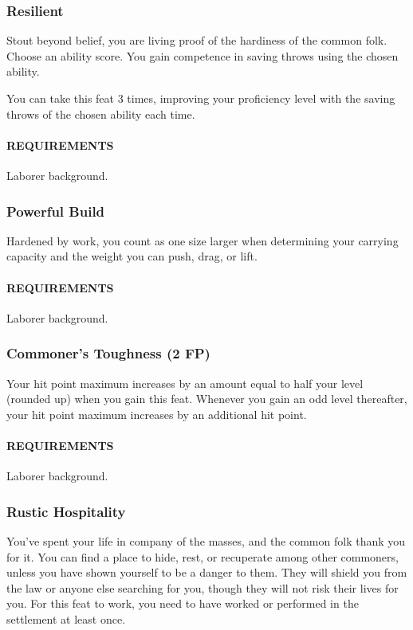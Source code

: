    \subsubsection{Resilient} \label{feat::resilient}
        Stout beyond belief, you are living proof of the hardiness of the common folk.
        Choose an ability score.
        You gain competence in saving throws using the chosen ability.

        You can take this feat 3 times, improving your proficiency level with the saving throws of the chosen ability each time.
        \paragraph{REQUIREMENTS} Laborer background.

    \subsubsection{Powerful Build} \label{feat::powerfulbuild}
        Hardened by work, you count as one size larger when determining your carrying capacity and the weight you can push, drag, or lift.
        \paragraph{REQUIREMENTS} Laborer background.

    \subsubsection{Commoner's Toughness (2 FP)} \label{feat::commonerstoughness}
        Your hit point maximum increases by an amount equal to half your level (rounded up) when you gain this feat.
        Whenever you gain an odd level thereafter, your hit point maximum increases by an additional hit point.
        \paragraph{REQUIREMENTS} Laborer background.

    \subsubsection{Rustic Hospitality} \label{feat::rustichospitality}
        You've spent your life in company of the masses, and the common folk thank you for it.
        You can find a place to hide, rest, or recuperate among other commoners, unless you have shown yourself to be a danger to them.
        They will shield you from the law or anyone else searching for you, though they will not risk their lives for you.
        For this feat to work, you need to have worked or performed in the settlement at least once.
